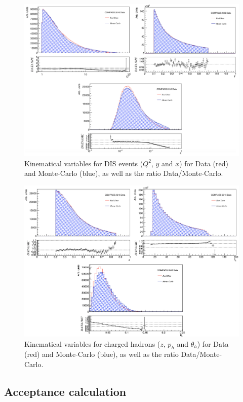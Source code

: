 \begin{figure}[!h]
  \centering
	\includegraphics[scale=0.50]{./gfx/DIS_kin.png}
	\caption{Kinematical variables for DIS events ($Q^2$, $y$ and $x$) for Data (red) and Monte-Carlo (blue), as well as the ratio Data/Monte-Carlo.}
	\label{pic:MCDISkin}
\end{figure}

\begin{figure}[!h]
  \centering
	\includegraphics[scale=0.50]{./gfx/SIDIS_kin.png}
	\caption{Kinematical variables for charged hadrons ($z$, $p_h$ and $\theta_h$) for Data (red) and Monte-Carlo (blue), as well as the ratio Data/Monte-Carlo.}
	\label{pic:MCSIDISkin}
\end{figure}

\subsection{Acceptance calculation}

